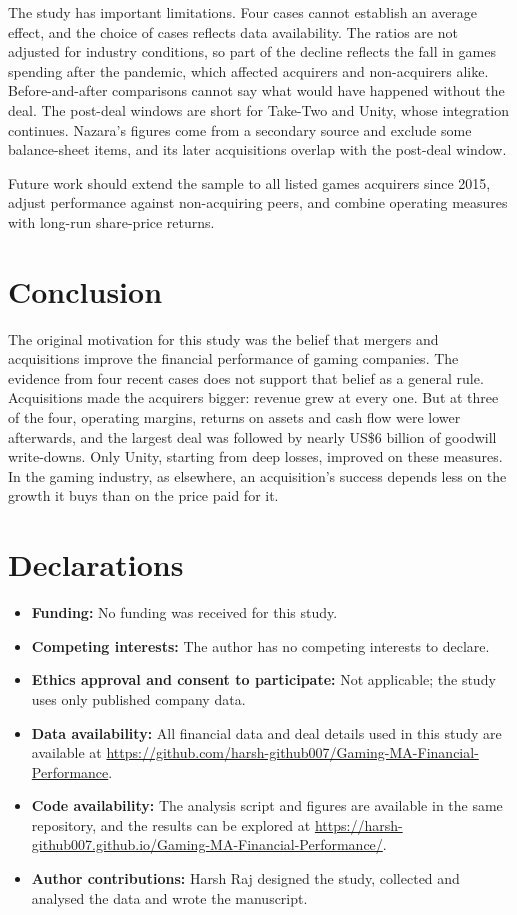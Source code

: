 \documentclass[sn-basic]{sn-jnl}
\newcommand{\USD}{US\$}
\begin{document}
The study has important limitations. Four cases cannot establish an average effect, and the choice of cases reflects data availability. The ratios are not adjusted for industry conditions, so part of the decline reflects the fall in games spending after the pandemic, which affected acquirers and non-acquirers alike. Before-and-after comparisons cannot say what would have happened without the deal. The post-deal windows are short for Take-Two and Unity, whose integration continues. Nazara's figures come from a secondary source and exclude some balance-sheet items, and its later acquisitions overlap with the post-deal window.

Future work should extend the sample to all listed games acquirers since 2015, adjust performance against non-acquiring peers, and combine operating measures with long-run share-price returns.

\section{Conclusion}\label{sec:conclusion}

The original motivation for this study was the belief that mergers and acquisitions improve the financial performance of gaming companies. The evidence from four recent cases does not support that belief as a general rule. Acquisitions made the acquirers bigger: revenue grew at every one. But at three of the four, operating margins, returns on assets and cash flow were lower afterwards, and the largest deal was followed by nearly \USD 6 billion of goodwill write-downs. Only Unity, starting from deep losses, improved on these measures. In the gaming industry, as elsewhere, an acquisition's success depends less on the growth it buys than on the price paid for it.

\backmatter

\section*{Declarations}

\begin{itemize}
\item \textbf{Funding:} No funding was received for this study.
\item \textbf{Competing interests:} The author has no competing interests to declare.
\item \textbf{Ethics approval and consent to participate:} Not applicable; the study uses only published company data.
\item \textbf{Data availability:} All financial data and deal details used in this study are available at \url{https://github.com/harsh-github007/Gaming-MA-Financial-Performance}.
\item \textbf{Code availability:} The analysis script and figures are available in the same repository, and the results can be explored at \url{https://harsh-github007.github.io/Gaming-MA-Financial-Performance/}.
\item \textbf{Author contributions:} Harsh Raj designed the study, collected and analysed the data and wrote the manuscript.
\end{itemize}


\end{document}
